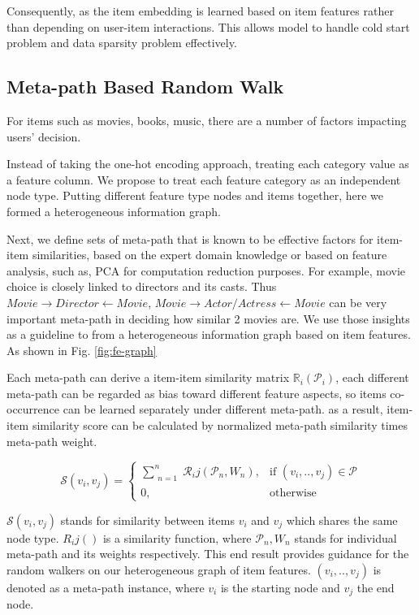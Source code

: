 Consequently, as the item embedding is learned based on item features rather than depending on user-item interactions. This allows model to handle cold start problem and data sparsity problem effectively. 



\subsection{Meta-path Based Random Walk}\label{3MF}

For items such as movies, books, music, there are a number of factors impacting users' decision. 

Instead of taking the one-hot encoding approach, treating each category value as a feature column. We propose to treat each feature category as an independent node type. Putting different feature type nodes and items together, here we formed a heterogeneous information graph. 

Next, we define sets of meta-path that is known to be effective factors for item-item similarities, based on the expert domain knowledge or based on feature analysis, such as, PCA for computation reduction purposes. For example, movie choice is closely linked to directors and its casts. Thus $Movie \rightarrow Director \leftarrow Movie$, $Movie \rightarrow Actor/Actress \leftarrow Movie$  can be very important meta-path in deciding how similar 2 movies are. We use those insights as a guideline to from a heterogeneous information graph based on item features. As shown in Fig. \ref{fig:fe-graph}

Each meta-path can derive a item-item similarity matrix $\mathbb{R}_i(\mathcal{P}_i)$, each different meta-path can be regarded as bias toward different feature aspects, so items co-occurrence can be learned separately under different meta-path.
as a result, item-item similarity score can be calculated by normalized meta-path similarity times meta-path weight.

\begin{equation}\label{itemsim}
    \mathcal{S}(v_i,v_j) = 
    \begin{cases}
         \sum\limits_{\substack{n=1}}^{n} \mathcal{R}_ij(\mathcal{P}_n,{W_n}),& \text{if } (v_{i}, .., v_{j}) \in \mathcal{P} \\
         0,              & \text{otherwise}
     \end{cases}
\end{equation}

$\mathcal{S}(v_i,v_j)$ stands for similarity between items $v_i$ and $v_j$ which shares the same node type. $R_ij()$ is a similarity function, where $\mathcal{P}_n, {W_n}$ stands for individual meta-path and its weights respectively. This end result provides guidance for the random walkers on our heterogeneous graph of item features. $(v_{i}, .., v_{j})$ is denoted as a meta-path instance, where $v_i$ is the starting node and $v_j$ the end node.

